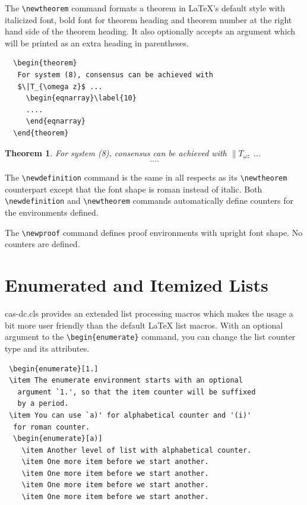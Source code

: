 \documentclass[a4paper,fleqn]{cas-dc}
\begin{document}
The \verb+\newtheorem+ command formats a
theorem in \LaTeX's default style with italicized font, bold font
for theorem heading and theorem number at the right hand side of the
theorem heading.  It also optionally accepts an argument which
will be printed as an extra heading in parentheses. 

\begin{verbatim}
  \begin{theorem} 
   For system (8), consensus can be achieved with 
   $\|T_{\omega z}$ ...
     \begin{eqnarray}\label{10}
     ....
     \end{eqnarray}
  \end{theorem}
\end{verbatim}  


\newtheorem{theorem}{Theorem}

\begin{theorem}
For system (8), consensus can be achieved with 
$\|T_{\omega z}$ ...
\begin{eqnarray}\label{10}
....
\end{eqnarray}
\end{theorem}

The \verb+\newdefinition+ command is the same in
all respects as its \verb+\newtheorem+ counterpart except that
the font shape is roman instead of italic.  Both
\verb+\newdefinition+ and \verb+\newtheorem+ commands
automatically define counters for the environments defined.

The \verb+\newproof+ command defines proof environments with
upright font shape.  No counters are defined. 


\section[Enumerated ...]{Enumerated and Itemized Lists}
{cas-dc.cls} provides an extended list processing macros
which makes the usage a bit more user friendly than the default
\LaTeX{} list macros.   With an optional argument to the
\verb+\begin{enumerate}+ command, you can change the list counter
type and its attributes.

\begin{verbatim}
 \begin{enumerate}[1.]
 \item The enumerate environment starts with an optional
   argument `1.', so that the item counter will be suffixed
   by a period.
 \item You can use `a)' for alphabetical counter and '(i)' 
  for roman counter.
  \begin{enumerate}[a)]
    \item Another level of list with alphabetical counter.
    \item One more item before we start another.
    \item One more item before we start another.
    \item One more item before we start another.
    \item One more item before we start another.
\end{verbatim}
\end{document}
